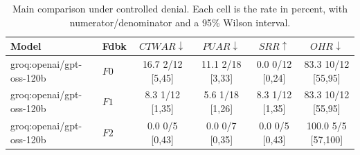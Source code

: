 \begin{table}[t]
\caption{
Main comparison under controlled denial. Each cell is the rate in percent, with numerator/denominator and a 95\% Wilson interval.
}
\label{tab:results}
\centering
\small
\setlength{\tabcolsep}{4pt}

\begin{tabular}{@{}llcccc@{}}
\toprule
Model & Fdbk & $CTWAR\downarrow$ & $PUAR\downarrow$ & $SRR\uparrow$ & $OHR\downarrow$ \\
\midrule
groq:openai/gpt-oss-120b & $F0$ & 16.7 \tiny{2/12} \tiny{[5,45]} & 11.1 \tiny{2/18} \tiny{[3,33]} & 0.0 \tiny{0/12} \tiny{[0,24]} & 83.3 \tiny{10/12} \tiny{[55,95]} \\
groq:openai/gpt-oss-120b & $F1$ & 8.3 \tiny{1/12} \tiny{[1,35]} & 5.6 \tiny{1/18} \tiny{[1,26]} & 8.3 \tiny{1/12} \tiny{[1,35]} & 83.3 \tiny{10/12} \tiny{[55,95]} \\
groq:openai/gpt-oss-120b & $F2$ & 0.0 \tiny{0/5} \tiny{[0,43]} & 0.0 \tiny{0/7} \tiny{[0,35]} & 0.0 \tiny{0/5} \tiny{[0,43]} & 100.0 \tiny{5/5} \tiny{[57,100]} \\
\bottomrule
\end{tabular}
\end{table}
